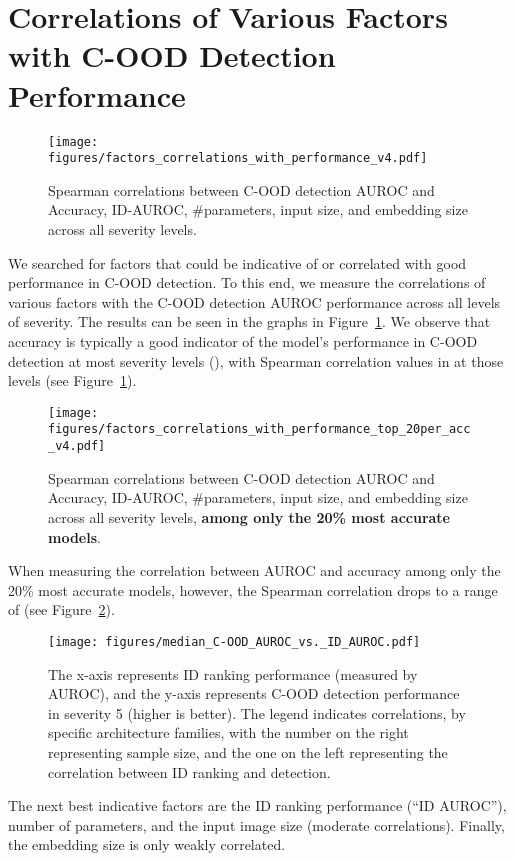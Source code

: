 \documentclass[table]{article} \usepackage{PRIMEarxiv}
\begin{document}
\section{Correlations of Various Factors with C-OOD Detection Performance}
\label{sec:correlations with C-OOD}

\begin{figure}[h]
    \centering
    \texttt{[image: figures/factors\_correlations\_with\_performance\_v4.pdf]}
    \caption{Spearman correlations between C-OOD detection AUROC and Accuracy,  ID-AUROC, \#parameters, input size, and embedding size across all severity levels.}
    \label{fig:models_factors_preformance_correlations}
\end{figure}
We searched for factors that could be indicative of or correlated
with good performance in C-OOD detection. To this end, we measure the correlations of 
various factors with the C-OOD detection AUROC performance across all levels of severity.
The results can be seen in the graphs in Figure~\ref{fig:models_factors_preformance_correlations}. 
We observe that accuracy is typically a good indicator of the model's performance in C-OOD detection at most severity levels (), with Spearman correlation values in  at those levels (see Figure~\ref{fig:models_factors_preformance_correlations}).
\begin{figure}[h]
    \centering
    \texttt{[image: figures/factors\_correlations\_with\_performance\_top\_20per\_acc\_v4.pdf]}
    \caption{Spearman correlations between C-OOD detection AUROC and Accuracy,  ID-AUROC, \#parameters, input size, and embedding size across all severity levels, \textbf{among only the 20\% most accurate models}.}
    \label{fig:models_factors_preformance_correlations_top_acc}
\end{figure}
When measuring the correlation between AUROC and accuracy among only the 20\% most accurate models, however, the Spearman correlation drops to a range of  (see Figure~\ref{fig:models_factors_preformance_correlations_top_acc}).

\begin{figure}[htb]
    \centering
\texttt{[image: figures/median\_C-OOD\_AUROC\_vs.\_ID\_AUROC.pdf]}
    \caption{The x-axis represents ID ranking performance (measured by AUROC), and the y-axis represents C-OOD detection performance in severity 5 (higher is better). The legend indicates correlations, by specific architecture families, with the number on the right representing sample size, and the one on the left representing the correlation between ID ranking and detection.}
    \label{fig:ID-AUROC vs OOD AUROC}
\end{figure}
The next best indicative factors are the ID ranking performance (``ID AUROC''), number of parameters, and the input image size (moderate correlations). Finally, the embedding size is only weakly correlated.
\end{document}
